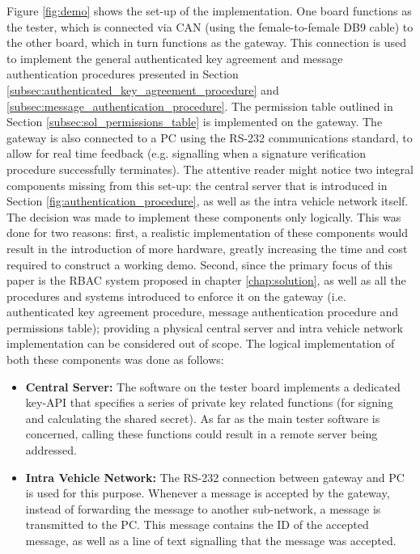 Figure \ref{fig:demo} shows the set-up of the implementation. One board functions as the tester, which is connected via CAN (using the female-to-female DB9 cable) to the other board, which in turn functions as the gateway. This connection is used to implement the general authenticated key agreement and message authentication procedures presented in Section \ref{subsec:authenticated_key_agreement_procedure} and \ref{subsec:message_authentication_procedure}. The permission table outlined in Section \ref{subsec:sol_permissions_table} is implemented on the gateway. The gateway is also connected to a PC using the RS-232 communications standard, to allow for real time feedback (e.g. signalling when a signature verification procedure successfully terminates). The attentive reader might notice two integral components missing from this set-up: the central server that is introduced in Section \ref{fig:authentication_procedure}, as well as the intra vehicle network itself. The decision was made to implement these components only logically. This was done for two reasons: first, a realistic implementation of these components would result in the introduction of more hardware, greatly increasing the time and cost required to construct a working demo. Second, since the primary focus of this paper is the RBAC system proposed in chapter \ref{chap:solution}, as well as all the procedures and systems introduced to enforce it on the gateway (i.e. authenticated key agreement procedure, message authentication procedure and permissions table); providing a physical central server and intra vehicle network implementation can be considered out of scope. The logical implementation of both these components was done as follows:
\begin{itemize}
	\item \textbf{Central Server:} The software on the tester board implements a dedicated key-API that specifies a series of private key related functions (for signing and calculating the shared secret). As far as the main tester software is concerned, calling these functions could result in a remote server being addressed.
	
	\item \textbf{Intra Vehicle Network:} The RS-232 connection between gateway and PC is used for this purpose. Whenever a message is accepted by the gateway, instead of forwarding the message to another sub-network, a message is transmitted to the PC. This message contains the ID of the accepted message, as well as a line of text signalling that the message was accepted.
\end{itemize}

